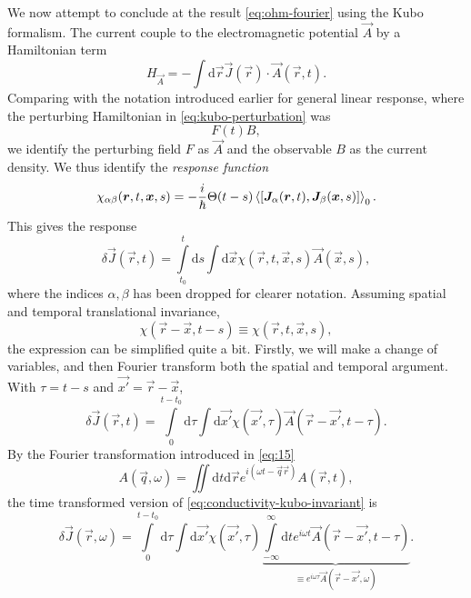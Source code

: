 We now attempt to conclude at the result \eqref{eq:ohm-fourier} using the Kubo formalism.
The current couple to the electromagnetic potential $\vec{A}$ by a Hamiltonian term
\begin{equation}
  \label{eq:electromagnetic-coupling}
  H_{\vec{A}} = -\int \mathrm{d}\vec{r}
  \vec{J}(\vec{r}) \cdot \vec{A}(\vec{r}, t).
\end{equation}
Comparing with the notation introduced earlier for general linear response, where the perturbing Hamiltonian in \cref{eq:kubo-perturbation} was
\[
F(t) {B},
\]
we identify the perturbing field $F$ as $\vec{A}$ and the observable ${B}$ as the current density.
We thus identify the \emph{response function}
\begin{equation}
  \chi_{\alpha\beta}(\vec{r}, t, \vec{x}, s) = - \frac{i}{\hbar} 
  \Theta(t-s)
  \Braket{
    \left[
      \vec{J}_{\alpha}(\vec{r}, t), \vec{J}_{\beta}(\vec{x}, s)
    \right]
  }_{0}.
\end{equation}
This gives the response
\begin{equation}
  \label{eq:conductivity-kubo}
  \delta  \vec{J}(\vec{r}, t) =
  \int\limits_{t_0}^{t} \! \mathrm{d}s
  \int \mathrm{d}\vec{x}
  \chi(\vec{r}, t, \vec{x}, s)
  \vec{A}(\vec{x}, s),
\end{equation}
where the indices $\alpha, \beta$ has been dropped for clearer notation.
Assuming spatial and temporal translational invariance,
\begin{equation}
  \label{eq:response_trans_invariant}
  \chi(\vec{r}-\vec{x}, t-s) \equiv \chi(\vec{r}, t, \vec{x}, s),
\end{equation}
the expression can be simplified quite a bit.
Firstly, we will make a change of variables, and then Fourier transform both the spatial and temporal argument.
With $\tau = t-s$ and $\vec{x'} = \vec{r} - \vec{x}$,
\begin{equation}
  \label{eq:conductivity-kubo-invariant}
  \delta \vec{J}(\vec{r}, t) =
  \int\limits_0^{t-t_0} \mathrm{d}\tau
  \int \mathrm{d}\vec{x'}
  \chi(\vec{x'}, \tau)
  \vec{A}(\vec{r} - \vec{x'}, t-\tau).
\end{equation}
By the Fourier transformation introduced in \cref{eq:15}
\[
  A(\vec{q}, \omega ) =
  \iint \mathrm{d}t \mathrm{d} \vec{r}
  e^{i(\omega  t - \vec{q} \vec{r} )}
  A(\vec{r}, t),
\]
the time transformed version of \cref{eq:conductivity-kubo-invariant} is 
\begin{equation}
  \delta \vec{J}(\vec{r}, \omega) = 
  \int\limits_0^{t-t_0} \! \mathrm{d}\tau
  \int \mathrm{d}\vec{x'}
  \chi(\vec{x'}, \tau)
  \underbrace{
    \int\limits_{-\infty}^{\infty} \mathrm{d}t
    e^{i \omega t}
    \vec{A}(\vec{r} - \vec{x'}, t-\tau)
    }_{\equiv e^{i\omega \tau} \vec{A}(\vec{r} - \vec{x'}, \omega)}.
\end{equation}
